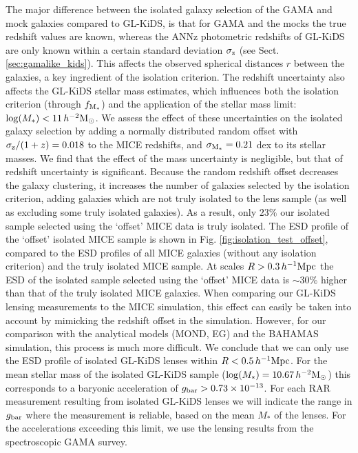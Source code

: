 \documentclass[usenatbib]{mnras}
\newcommand{\hmsun}{\,h^{-2} {\rm M_\odot}}
\newcommand{\hMpc}{\, h^{-1}{\rm{Mpc}} }
\newcommand*{\E}[1]{\times 10^{#1}}
\newcommand{\un}[1]{_{\rm #1}}
\begin{document}
The major difference between the isolated galaxy selection of the GAMA and mock galaxies compared to GL-KiDS, is that for GAMA and the mocks the true redshift values are known, whereas the ANNz photometric redshifts of GL-KiDS are only known within a certain standard deviation $\sigma\un{z}$ (see Sect. \ref{sec:gamalike_kids}). This affects the observed spherical distances $r$ between the galaxies, a key ingredient of the isolation criterion. The redshift uncertainty also affects the GL-KiDS stellar mass estimates, which influences both the isolation criterion (through $f\un{M_*}$) and the application of the stellar mass limit: $\log(M_*) < 11 \hmsun$. We assess the effect of these uncertainties on the isolated galaxy selection by adding a normally distributed random offset with $\sigma\un{z}/(1+z) = 0.018$ to the MICE redshifts, and $\sigma\un{M_*} = 0.21$ dex to its stellar masses. We find that the effect of the mass uncertainty is negligible, but that of redshift uncertainty is significant. Because the random redshift offset decreases the galaxy clustering, it increases the number of galaxies selected by the isolation criterion, adding galaxies which are not truly isolated to the lens sample (as well as excluding some truly isolated galaxies). As a result, only $23\%$ our isolated sample selected using the `offset' MICE data is truly isolated. The ESD profile of the `offset' isolated MICE sample is shown in Fig. \ref{fig:isolation_test_offset}, compared to the ESD profiles of all MICE galaxies (without any isolation criterion) and the truly isolated MICE sample. At scales $R > 0.3 \hMpc$ the ESD of the isolated sample selected using the `offset' MICE data is $\sim 30\%$ higher than that of the truly isolated MICE galaxies. When comparing our GL-KiDS lensing measurements to the MICE simulation, this effect can easily be taken into account by mimicking the redshift offset in the simulation. However, for our comparison with the analytical models (MOND, EG) and the BAHAMAS simulation, this process is much more difficult. We conclude that we can only use the ESD profile of isolated GL-KiDS lenses within $R < 0.5 \hMpc$. For the mean stellar mass of the isolated GL-KiDS sample ($\log(M_*) = 10.67 \hmsun$) this corresponds to a baryonic acceleration of $g\un{bar}>0.73\E{-13}$. For each RAR measurement resulting from isolated GL-KiDS lenses we will indicate the range in $g\un{bar}$ where the measurement is reliable, based on the mean $M_*$ of the lenses. For the accelerations exceeding this limit, we use the lensing results from the spectroscopic GAMA survey.
\end{document}
